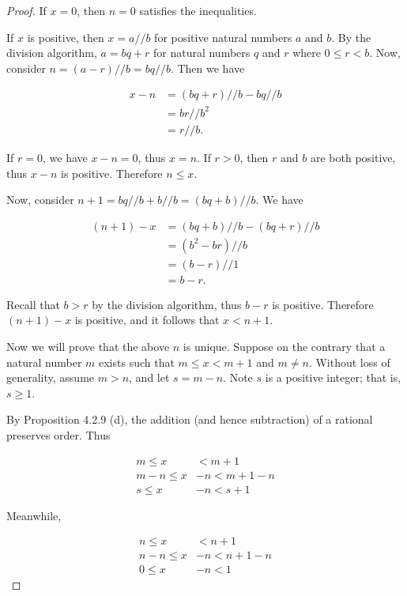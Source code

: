 \documentclass{article}
\begin{document}
\begin{proof}
If $x = 0$, then $n = 0$ satisfies the inequalities. 

If $x$ is positive, then $x = a // b$ for positive natural numbers $a$ and $b$. By the division algorithm, $a = bq + r$ for natural numbers $q$ and $r$ where $0 \leq r < b$. Now, consider $n = (a - r) // b = bq // b$. Then we have

\begin{align*}
x - n &= (bq + r)//b - bq // b \\
&= br // b^2 \\
&= r // b.
\end{align*}

If $r = 0$, we have $x - n = 0$, thus $x = n$. If $r > 0$, then $r$ and $b$ are both positive, thus $x - n$ is positive. Therefore $n \leq x$.

Now, consider $n + 1 = bq // b + b // b = (bq + b) // b$. We have

\begin{align*}
(n + 1) - x &= (bq + b) // b - (bq + r) // b \\
&= (b^2 - br) // b \\
&= (b - r) // 1 \\
&= b - r.
\end{align*}

Recall that $b > r$ by the division algorithm, thus $b-r$ is positive. Therefore $(n+1) - x$ is positive, and it follows that $x < n + 1$.

Now we will prove that the above $n$ is unique. Suppose on the contrary that a natural number $m$ exists such that $m \leq x < m + 1$ and $m \neq n$. Without loss of generality, assume $m > n$, and let $s = m - n$. Note $s$ is a positive integer; that is, $s \geq 1$.

By Proposition 4.2.9 (d), the addition (and hence subtraction) of a rational preserves order. Thus

\begin{align*}
m \leq x &< m + 1 \\
m - n \leq x &- n < m + 1 - n \\
s \leq x &- n < s + 1
\end{align*}

Meanwhile, 

\begin{align*}
n \leq x &< n + 1 \\
n - n \leq x &- n < n + 1 - n \\
0 \leq x &- n < 1
\end{align*}


\end{proof}
\end{document}
